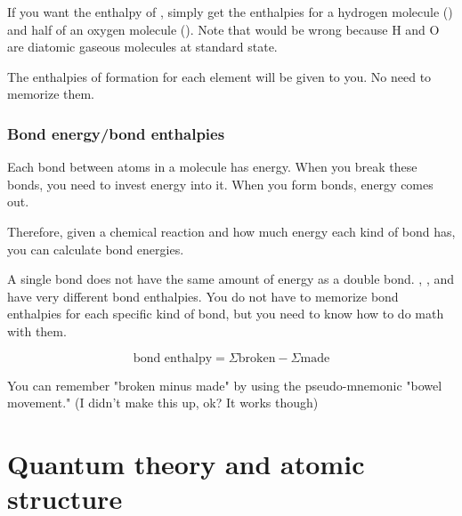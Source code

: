 \documentclass[letterpaper, 12pt]{article}
\begin{document}
If you want the enthalpy of , simply get the enthalpies for a hydrogen molecule () and half of an oxygen molecule (). Note that  would be wrong because H and O are diatomic gaseous molecules at standard state.

The enthalpies of formation for each element will be given to you. No need to memorize them.

\section{Bond energy/bond enthalpies}
Each bond between atoms in a molecule has energy. When you break these bonds, you need to invest energy into it. When you form bonds, energy comes out.

Therefore, given a chemical reaction and how much energy each kind of bond has, you can calculate bond energies.

A single bond does not have the same amount of energy as a double bond. , , and  have very different bond enthalpies. You do not have to memorize bond enthalpies for each specific kind of bond, but you need to know how to do math with them.

$$\text{bond enthalpy} = \Sigma \text{broken} - \Sigma \text{made}$$

You can remember "broken minus made" by using the pseudo-mnemonic "bowel movement." (I didn't make this up, ok? It works though)

\clearpage

\part{Quantum theory and atomic structure}
\end{document}
